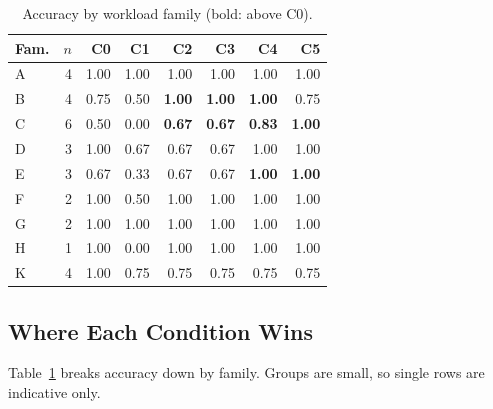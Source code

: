 \documentclass[journal]{IEEEtran}
\begin{document}
\begin{table}[t]\centering\caption{Accuracy by workload family (bold: above C0).}\label{tab:famres}\scriptsize\setlength{\tabcolsep}{3pt}
\begin{tabular}{lrrrrrrr}\toprule Fam. & $n$ & C0 & C1 & C2 & C3 & C4 & C5\\\midrule
A & 4 & 1.00 & 1.00 & 1.00 & 1.00 & 1.00 & 1.00 \\
B & 4 & 0.75 & 0.50 & \textbf{1.00} & \textbf{1.00} & \textbf{1.00} & 0.75 \\
C & 6 & 0.50 & 0.00 & \textbf{0.67} & \textbf{0.67} & \textbf{0.83} & \textbf{1.00} \\
D & 3 & 1.00 & 0.67 & 0.67 & 0.67 & 1.00 & 1.00 \\
E & 3 & 0.67 & 0.33 & 0.67 & 0.67 & \textbf{1.00} & \textbf{1.00} \\
F & 2 & 1.00 & 0.50 & 1.00 & 1.00 & 1.00 & 1.00 \\
G & 2 & 1.00 & 1.00 & 1.00 & 1.00 & 1.00 & 1.00 \\
H & 1 & 1.00 & 0.00 & 1.00 & 1.00 & 1.00 & 1.00 \\
K & 4 & 1.00 & 0.75 & 0.75 & 0.75 & 0.75 & 0.75 \\
\bottomrule\end{tabular}\end{table}
\subsection{Where Each Condition Wins}
Table~\ref{tab:famres} breaks accuracy down by family. Groups are small, so single rows are indicative only.
\end{document}
